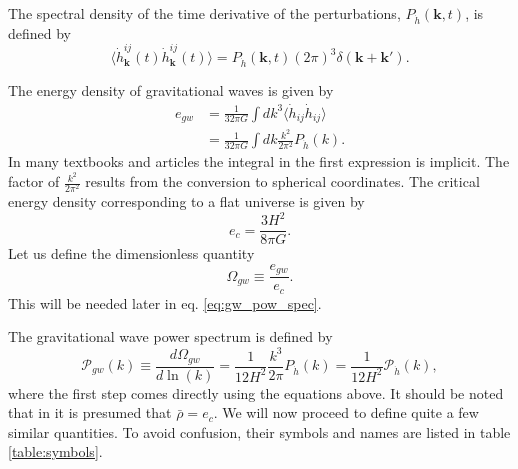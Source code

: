 The spectral density of the time derivative of the perturbations, $P_{\dot{h}}(\bm{k},t)$, is defined by
\cite[eq. 3.4]{hindmarsh_gw_pt_2019}
\begin{equation}
\langle \dot{h}_{\bm{k}}^{ij}(t) \dot{h}_{\bm{k}}^{ij}(t) \rangle = P_{\dot{h}}(\bm{k},t) (2\pi)^3 \delta (\bm{k} + \bm{k}').
\label{eq:hbracket}
\end{equation}

The energy density of gravitational waves is given by
\cites[eq. 3.3]{hindmarsh_gw_pt_2019}[eq. 1.135, 7.193]{maggiore_gw_2008}
\begin{align}
e_{gw}
&= \frac{1}{32 \pi G} \int dk^3 \langle \dot{h}_{ij} \dot{h}_{ij} \rangle \\
&= \frac{1}{32 \pi G} \int dk \frac{k^2}{2 \pi^2} P_{\dot{h}}(k).
\end{align}
In many textbooks and articles the integral in the first expression is implicit.
The factor of $\frac{k^2}{2\pi^2}$ results from the conversion to spherical coordinates.
The critical energy density corresponding to a flat universe is given by
\cite[eq. 7.196]{maggiore_gw_2008}
\begin{equation}
e_c = \frac{3 H^2}{8 \pi G}.
\label{eq:e_crit}
\end{equation}
Let us define the dimensionless quantity
\begin{equation}
\Omega_{gw} \equiv \frac{e_{gw}}{e_c}.
\label{eq:omega_gw}
\end{equation}
This will be needed later in eq. \eqref{eq:gw_pow_spec}.

The gravitational wave power spectrum is defined by
\cite[eq. 3.45]{hindmarsh_gw_pt_2019}
\begin{equation}
\mathcal{P}_{gw}(k)
\equiv \frac{d \Omega_{gw}}{d \ln (k)}
= \frac{1}{12 H^2} \frac{k^3}{2\pi} P_{\dot{h}}(k)
= \frac{1}{12 H^2} \mathcal{P}_{\dot{h}}(k),
\label{eq:gw_pow_spec}
\end{equation}
where the first step comes directly using the equations above.
It should be noted that in \cite[eq. 3.6]{hindmarsh_gw_pt_2019} it is presumed that $\bar{\rho}=e_c$.
We will now proceed to define quite a few similar quantities.
To avoid confusion, their symbols and names are listed in table \ref{table:symbols}.


